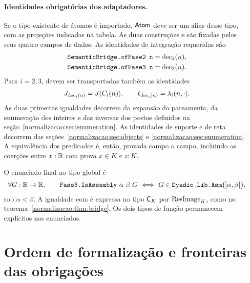 \paragraph{Identidades obrigatórias dos adaptadores.}
Se o tipo existente de átomos é importado, $\mathsf{Atom}$ deve ser um
alias desse tipo, com as projeções indicadas na tabela.
As duas construções  e  são fixadas
pelos seus quatro campos de dados. As identidades de integração
requeridas são
\[
 \begin{aligned}
 \text{\ttfamily SemanticBridge.ofFase2 n}&=\operatorname{dec}_2(n),\\
 \text{\ttfamily SemanticBridge.ofFase3 n}&=\operatorname{dec}_3(n).
 \end{aligned}
\]
Para $i=2,3$, devem ser transportadas também as identidades
\[
 J_{\operatorname{dec}_i(n)}=J(C_i(n)),\qquad
 \ell_{\operatorname{dec}_i(n)}=\lambda_i(n,\cdot).
\]
As duas primeiras igualdades decorrem da expansão do pareamento, da
enumeração dos inteiros e das inversas dos postos definidos na
seção~\ref{normalizacao:sec:enumeration}. As identidades de suporte e de reta decorrem das
seções~\ref{normalizacao:sec:objects} e \ref{normalizacao:sec:enumeration}.
A equivalência dos predicados é, então, provada campo a campo,
incluindo as coerções entre $x:\mathbb R$ com prova $x\in K$ e $z:K$.

O enunciado final no tipo global é
\[
 \forall G:\mathbb R\to\mathbb R,\qquad
 \text{\ttfamily Fase3.IsAssembly}\ \alpha\ \beta\ G
 \ \Longleftrightarrow\
 G\in\text{\ttfamily Dyadic.Lib.Asm}\bigl([\alpha,\beta]\bigr),
\]
sob $\alpha<\beta$. A igualdade com  é
expressa no tipo $\mathsf C_K$ por $\operatorname{ResImage}_K$, como no
teorema~\ref{normalizacao:thm:bridge}. Os dois tipos de função permanecem
explícitos nos enunciados.

\section{Ordem de formalização e fronteiras das obrigações}
\label{normalizacao:sec:dependencies}

